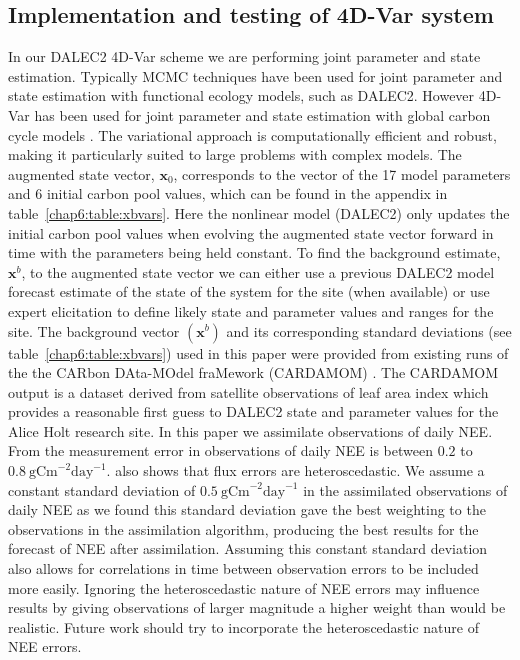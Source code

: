 \subsection{Implementation and testing of 4D-Var system} \label{chap6:sec:implement4dvar}

In our DALEC2 4D-Var scheme we are performing joint parameter and state estimation. Typically MCMC techniques have been used for joint parameter and state estimation with functional ecology models, such as DALEC2. However 4D-Var has been used for joint parameter and state estimation with global carbon cycle models \citep{Kaminski2013}. The variational approach is computationally efficient and robust, making it particularly suited to large problems with complex models. The augmented state vector, $\textbf{x}_0$, corresponds to the vector of the 17 model parameters and 6 initial carbon pool values, which can be found in the appendix in table~\ref{chap6:table:xbvars}. Here the nonlinear model (DALEC2) only updates the initial carbon pool values when evolving the augmented state vector forward in time with the parameters being held constant. To find the background estimate, $\textbf{x}^{b}$, to the augmented state vector we can either use a previous DALEC2 model forecast estimate of the state of the system for the site (when available) or use expert elicitation to define likely state and parameter values and ranges for the site. The background vector $(\textbf{x}^b)$ and its corresponding standard deviations (see table~\ref{chap6:table:xbvars}) used in this paper were provided from existing runs of the the CARbon DAta-MOdel fraMework (CARDAMOM) \citep{Exbrayat2015}. The CARDAMOM output is a dataset derived from satellite observations of leaf area index which provides a reasonable first guess to DALEC2 state and parameter values for the Alice Holt research site. In this paper we assimilate observations of daily NEE. From \citet{Richardson200838} the measurement error in observations of daily NEE is between $0.2$ to $0.8~\text{gCm}^{-2}\text{day}^{-1}$.  \citet{Richardson200838} also shows that flux errors are heteroscedastic. We assume a constant standard deviation of $0.5~\text{gCm}^{-2}\text{day}^{-1}$ in the assimilated observations of daily NEE as we found this standard deviation gave the best weighting to the observations in the assimilation algorithm, producing the best results for the forecast of NEE after assimilation. Assuming this constant standard deviation also allows for correlations in time between observation errors to be included more easily. Ignoring the heteroscedastic nature of NEE errors may influence results by giving observations of larger magnitude a higher weight than would be realistic. Future work should try to incorporate the heteroscedastic nature of NEE errors.

